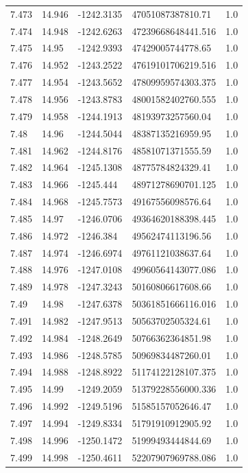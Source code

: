 \begin{tabular}{lllll}
7.473 & 14.946 & -1242.3135 & 47051087387810.71 & 1.0 \\
7.474 & 14.948 & -1242.6263 & 47239668648441.516 & 1.0 \\
7.475 & 14.95 & -1242.9393 & 47429005744778.65 & 1.0 \\
7.476 & 14.952 & -1243.2522 & 47619101706219.516 & 1.0 \\
7.477 & 14.954 & -1243.5652 & 47809959574303.375 & 1.0 \\
7.478 & 14.956 & -1243.8783 & 48001582402760.555 & 1.0 \\
7.479 & 14.958 & -1244.1913 & 48193973257560.04 & 1.0 \\
7.48 & 14.96 & -1244.5044 & 48387135216959.95 & 1.0 \\
7.481 & 14.962 & -1244.8176 & 48581071371555.59 & 1.0 \\
7.482 & 14.964 & -1245.1308 & 48775784824329.41 & 1.0 \\
7.483 & 14.966 & -1245.444 & 48971278690701.125 & 1.0 \\
7.484 & 14.968 & -1245.7573 & 49167556098576.64 & 1.0 \\
7.485 & 14.97 & -1246.0706 & 49364620188398.445 & 1.0 \\
7.486 & 14.972 & -1246.384 & 49562474113196.56 & 1.0 \\
7.487 & 14.974 & -1246.6974 & 49761121038637.64 & 1.0 \\
7.488 & 14.976 & -1247.0108 & 49960564143077.086 & 1.0 \\
7.489 & 14.978 & -1247.3243 & 50160806617608.66 & 1.0 \\
7.49 & 14.98 & -1247.6378 & 50361851666116.016 & 1.0 \\
7.491 & 14.982 & -1247.9513 & 50563702505324.61 & 1.0 \\
7.492 & 14.984 & -1248.2649 & 50766362364851.98 & 1.0 \\
7.493 & 14.986 & -1248.5785 & 50969834487260.01 & 1.0 \\
7.494 & 14.988 & -1248.8922 & 51174122128107.375 & 1.0 \\
7.495 & 14.99 & -1249.2059 & 51379228556000.336 & 1.0 \\
7.496 & 14.992 & -1249.5196 & 51585157052646.47 & 1.0 \\
7.497 & 14.994 & -1249.8334 & 51791910912905.92 & 1.0 \\
7.498 & 14.996 & -1250.1472 & 51999493444844.69 & 1.0 \\
7.499 & 14.998 & -1250.4611 & 52207907969788.086 & 1.0 \\

\end{tabular}
